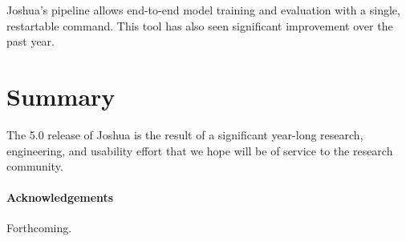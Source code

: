 \documentclass[11pt]{article}
\begin{document}
Joshua's pipeline allows end-to-end model training and evaluation with
a single, restartable command. This tool has also seen significant
improvement over the past year.

\section{Summary}

The 5.0 release of Joshua is the result of a significant year-long
research, engineering, and usability effort that we hope will be of
service to the research community.  

\paragraph{Acknowledgements}

Forthcoming.




\end{document}
